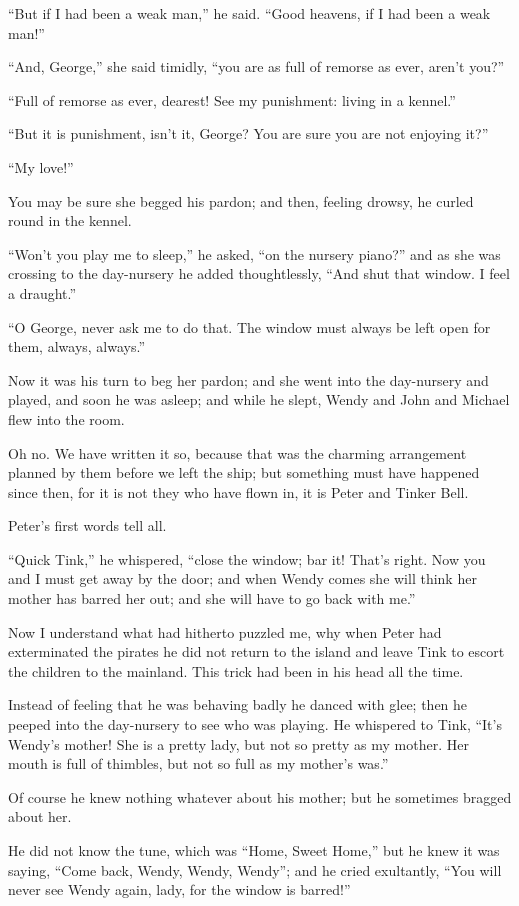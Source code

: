 ``But if I had been a weak man,'' he said. ``Good heavens, if I had been a
weak man!''

``And, George,'' she said timidly, ``you are as full of remorse as ever,
aren't you?''

``Full of remorse as ever, dearest! See my punishment: living in a
kennel.''

``But it is punishment, isn't it, George? You are sure you are not
enjoying it?''

``My love!''

You may be sure she begged his pardon; and then, feeling drowsy, he
curled round in the kennel.

``Won't you play me to sleep,'' he asked, ``on the nursery piano?'' and as
she was crossing to the day-nursery he added thoughtlessly, ``And shut
that window. I feel a draught.''

``O George, never ask me to do that. The window must always be left open
for them, always, always.''

Now it was his turn to beg her pardon; and she went into the
day-nursery and played, and soon he was asleep; and while he slept,
Wendy and John and Michael flew into the room.

Oh no. We have written it so, because that was the charming arrangement
planned by them before we left the ship; but something must have
happened since then, for it is not they who have flown in, it is Peter
and Tinker Bell.

Peter's first words tell all.

``Quick Tink,'' he whispered, ``close the window; bar it! That's right.
Now you and I must get away by the door; and when Wendy comes she will
think her mother has barred her out; and she will have to go back with
me.''

Now I understand what had hitherto puzzled me, why when Peter had
exterminated the pirates he did not return to the island and leave Tink
to escort the children to the mainland. This trick had been in his head
all the time.

Instead of feeling that he was behaving badly he danced with glee; then
he peeped into the day-nursery to see who was playing. He whispered to
Tink, ``It's Wendy's mother! She is a pretty lady, but not so pretty as
my mother. Her mouth is full of thimbles, but not so full as my
mother's was.''

Of course he knew nothing whatever about his mother; but he sometimes
bragged about her.

He did not know the tune, which was ``Home, Sweet Home,'' but he knew it
was saying, ``Come back, Wendy, Wendy, Wendy''; and he cried exultantly,
``You will never see Wendy again, lady, for the window is barred!''

